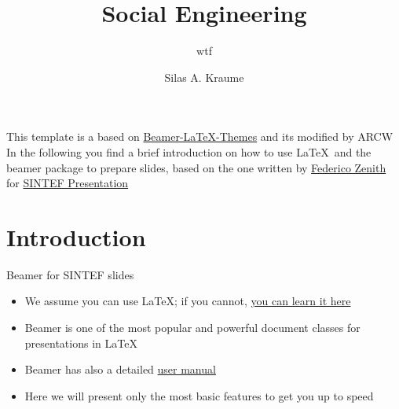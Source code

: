 \documentclass{beamer}
\title{Social Engineering}
\subtitle{wtf}
\author{Silas A. Kraume}
\date{}
\newcommand{\hrefcol}[2]{\textcolor{cyan}{\href{#1}{#2}}}
\begin{document}
\maketitle

\begin{frame}
    This template is a based on \hrefcol{https://github.com/TOB-KNPOB/Beamer-LaTeX-Themes}{Beamer-LaTeX-Themes} and its modified by ARCW
    \vspace{\baselineskip}
    In the following you find a brief introduction on how to use \LaTeX\ and the beamer package to prepare slides, based on the one written by \hrefcol{mailto:federico.zenith@sintef.no}{Federico Zenith} for \hrefcol{https://www.overleaf.com/latex/templates/sintef-presentation/jhbhdffczpnx}{SINTEF Presentation}
\end{frame}

\section{Introduction}

\begin{frame}{Beamer for SINTEF slides}
    \begin{itemize}
        \item We assume you can use \LaTeX; if you cannot,
              \hrefcol{http://en.wikibooks.org/wiki/LaTeX/}{you can learn it here}
        \item Beamer is one of the most popular and powerful document
              classes for presentations in \LaTeX
        \item Beamer has also a detailed
              \hrefcol{http://www.ctan.org/tex-archive/macros/latex/contrib/beamer/doc/beameruserguide.pdf}{user
                  manual}
        \item Here we will present only the most basic features to get you up to speed
    \end{itemize}
\end{frame}
\end{document}
